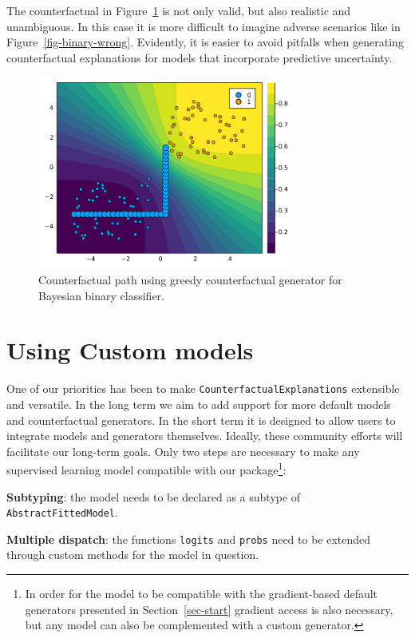 \documentclass{juliacon}
\begin{document}
The counterfactual in Figure~\ref{fig-binary-laplace} is not only valid,
but also realistic and unambiguous. In this case it is more difficult to
imagine adverse scenarios like in Figure~\ref{fig-binary-wrong}.
Evidently, it is easier to avoid pitfalls when generating counterfactual
explanations for models that incorporate predictive uncertainty.

\begin{figure}

{\centering \includegraphics[width=3.33333in,height=2.5in]{www/ce_binary_laplace.png}

}

\caption{\label{fig-binary-laplace}Counterfactual path using greedy
counterfactual generator for Bayesian binary classifier.}

\end{figure}

\hypertarget{sec-custom}{%
\section{Using Custom models}\label{sec-custom}}

One of our priorities has been to make
\texttt{CounterfactualExplanations} extensible and versatile. In the long
term we aim to add support for more default models and counterfactual
generators. In the short term it is designed to allow users to integrate
models and generators themselves. Ideally, these community efforts will
facilitate our long-term goals. Only two steps are necessary to make any
supervised learning model compatible with our package\footnote{In order
  for the model to be compatible with the gradient-based default
  generators presented in Section~\ref{sec-start} gradient access is
  also necessary, but any model can also be complemented with a custom
  generator.}:

\begin{unnumlist}
\item \textbf{Subtyping}: the model needs to be declared as a subtype of \texttt{AbstractFittedModel}.
\item \textbf{Multiple dispatch}: the functions \texttt{logits} and \texttt{probs} need to be extended through custom methods for the model in question.
\end{unnumlist}
\end{document}
